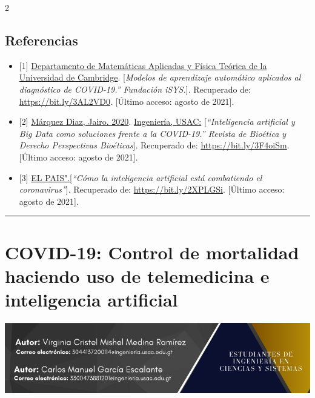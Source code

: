 \documentclass[12pt,spanish,Letterpaper,openany]{book}
\newcommand{\HRule}{\begin{center}\rule{0.5\linewidth}{0.2mm}\end{center}}
\begin{document}
\begin {multicols}{2}
{\section{Referencias}\label{referencias-3}}

\begin{itemize}
\item
  {[}1{]} \href{https://www.fundacionisys.org/}{Departamento de Matemáticas Aplicadas y Física Teórica de la Universidad de Cambridge}. {[}\emph{Modelos de aprendizaje automático aplicados al diagnóstico de COVID-19.'' Fundación iSYS.}{]}. Recuperado de: \url{https://bit.ly/3AL2VD0}. {[}Último acceso: agosto de 2021{]}.
\item
  {[}2{]} \href{https://portal.ingenieria.usac.edu.gt/}{Márquez Diaz, Jairo. 2020}. \href{https://scielo.isciii.es/}{Ingeniería, USAC:} {[}\emph{``Inteligencia artificial y Big Data como soluciones frente a la COVID-19.'' Revista de Bioética y Derecho Perspectivas Bioéticas}{]}. Recuperado de: \url{https://bit.ly/3F4oiSm}. {[}Último acceso: agosto de 2021{]}.
\item
  {[}3{]} \href{https:/elpais.com/}{EL PAIS".}{[}\emph{``Cómo la inteligencia artificial está combatiendo el coronavirus''}{]}. Recuperado de: \url{https://bit.ly/2XPLGSi}. {[}Último acceso: agosto de 2021{]}.
\end{itemize}

\end {multicols}

\medskip

\HRule

\medskip

\hypertarget{pareja35}{%
\chapter{COVID-19: Control de mortalidad haciendo uso de telemedicina e inteligencia artificial}\label{pareja35}}

\begin{center}\includegraphics[width=1\linewidth]{images/pareja35_01} \end{center}
\end{document}

